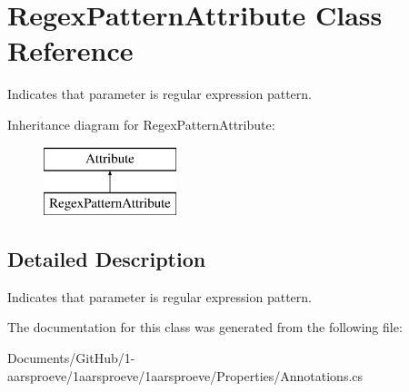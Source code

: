 \hypertarget{class_regex_pattern_attribute}{}\section{Regex\+Pattern\+Attribute Class Reference}
\label{class_regex_pattern_attribute}


Indicates that parameter is regular expression pattern.  


Inheritance diagram for Regex\+Pattern\+Attribute\+:\begin{figure}[H]
\begin{center}
\leavevmode
\includegraphics[height=2.000000cm]{class_regex_pattern_attribute}
\end{center}
\end{figure}


\subsection{Detailed Description}
Indicates that parameter is regular expression pattern. 



The documentation for this class was generated from the following file\+:\begin{DoxyCompactItemize}
\item 
Documents/\+Git\+Hub/1-\/aarsproeve/1aarsproeve/1aarsproeve/\+Properties/Annotations.\+cs\end{DoxyCompactItemize}
